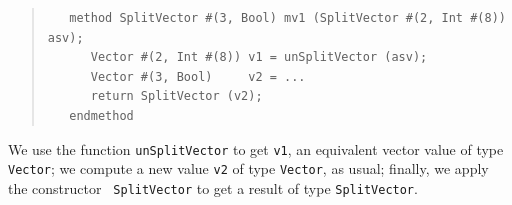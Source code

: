 \begin{quote}
\begin{verbatim}
   method SplitVector #(3, Bool) mv1 (SplitVector #(2, Int #(8)) asv);
      Vector #(2, Int #(8)) v1 = unSplitVector (asv);
      Vector #(3, Bool)     v2 = ...
      return SplitVector (v2);
   endmethod
\end{verbatim}
\end{quote}

We use the function {\tt unSplitVector} to get {\tt v1}, an equivalent
vector value of type {\tt Vector}; we compute a new value {\tt v2} of
type {\tt Vector}, as usual; finally, we apply the constructor {\tt
SplitVector} to get a result of type {\tt SplitVector}.

